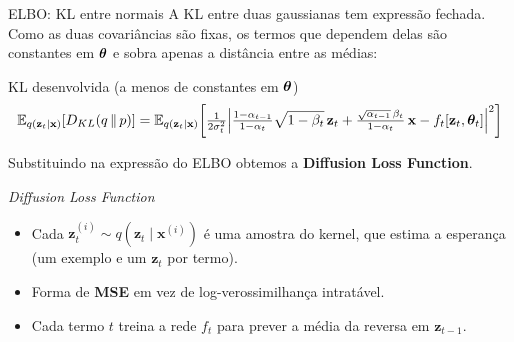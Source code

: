 \documentclass[aspectratio=169,xcolor=dvipsnames]{beamer}
\begin{document}
  \begin{frame}{ELBO: KL entre normais}
    A KL entre duas gaussianas tem expressão fechada. Como as duas
    covariâncias são fixas, os termos que dependem delas são constantes
    em $\bm{\theta}$ e sobra apenas a distância entre as médias:
    \vspace{0.4em}
    \begin{block}{KL desenvolvida (a menos de constantes em $\bm{\theta}$)}
      \[
        \mathbb{E}_{q(\mathbf{z}_t|\mathbf{x})}\!\left[D_{KL}\!\left(q\,\|\,p\right)\right]
        =
        \mathbb{E}_{q(\mathbf{z}_t|\mathbf{x})}\!\left[
        \tfrac{1}{2\sigma_t^{2}}\!\left|
          \tfrac{1-\alpha_{t-1}}{1-\alpha_t}\sqrt{1-\beta_t}\, \mathbf{z}_t
          + \tfrac{\sqrt{\alpha_{t-1}}\,\beta_t}{1-\alpha_t}\, \mathbf{x}
          - f_t[\mathbf{z}_t,\bm{\theta}_t]
        \right|^{2}\right]
      \]
    \end{block}
    \vspace{0.3em}
    Substituindo na expressão do ELBO obtemos a \textbf{Diffusion Loss
    Function}.
  \end{frame}

  \begin{frame}{\textit{Diffusion Loss Function}}
    \vspace{0.5em}
    \begin{itemize}
      \item Cada $\mathbf{z}_t^{(i)} \sim q(\mathbf{z}_t \mid \mathbf{x}^{(i)})$ é uma
      amostra do kernel, que estima a esperança (um exemplo e um
      $\mathbf{z}_t$ por termo).
      \item Forma de \textbf{MSE} em vez de log-verossimilhança
      intratável.
      \item Cada termo $t$ treina a rede $f_t$ para prever a média da
      reversa em $\mathbf{z}_{t-1}$.
    \end{itemize}
  \end{frame}
\end{document}
